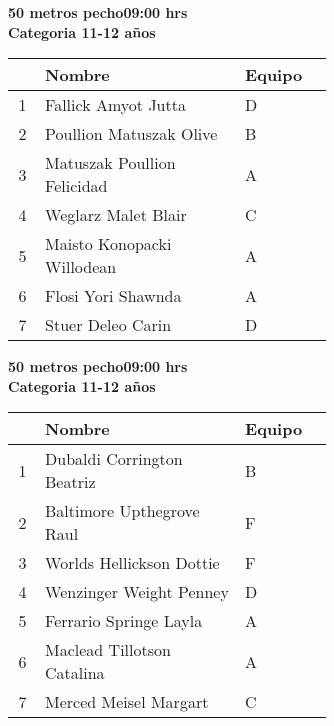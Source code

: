 \begin{minipage}{0.95\linewidth}\vspace{0.5cm} 
\begin{flushleft}
\textbf{
\hspace{-0.15cm}50 metros pecho\hspace{1.5cm}09:00 hrs \\Categoria 11-12 años}\vspace{-0.2cm} 
\end{flushleft}
\begin{tabular}{cp{0.63\linewidth}l}
\hline
& \textbf{Nombre} & \textbf{Equipo} \\ \hline
1 & Fallick Amyot Jutta & D \\ 
2 & Poullion Matuszak Olive & B \\ 
3 & Matuszak Poullion Felicidad & A \\ 
4 & Weglarz Malet Blair & C \\ 
5 & Maisto Konopacki Willodean & A \\ 
6 & Flosi Yori Shawnda & A \\ 
7 & Stuer Deleo Carin & D \\ 
\end{tabular}
\end{minipage}
\begin{minipage}{0.95\linewidth}\vspace{0.5cm} 
\begin{flushleft}
\textbf{
\hspace{-0.15cm}50 metros pecho\hspace{1.5cm}09:00 hrs \\Categoria 11-12 años}\vspace{-0.2cm} 
\end{flushleft}
\begin{tabular}{cp{0.63\linewidth}l}
\hline
& \textbf{Nombre} & \textbf{Equipo} \\ \hline
1 & Dubaldi Corrington Beatriz & B \\ 
2 & Baltimore Upthegrove Raul & F \\ 
3 & Worlds Hellickson Dottie & F \\ 
4 & Wenzinger Weight Penney & D \\ 
5 & Ferrario Springe Layla & A \\ 
6 & Maclead Tillotson Catalina & A \\ 
7 & Merced Meisel Margart & C \\ 
\end{tabular}
\end{minipage}
